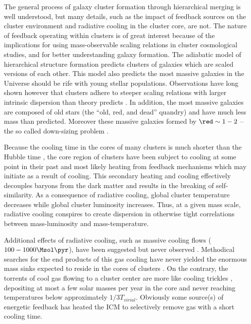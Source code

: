 \documentclass[12pt, preprint]{aastex}
\begin{document}
The general process of galaxy cluster formation through hierarchical
merging is well understood, but many details, such as the impact of
feedback sources on the cluster environment and radiative cooling in
the cluster core, are not. The nature of feedback operating within
clusters is of great interest because of the implications for using
mass-observable scaling relations in cluster cosmological studies, and
for better understanding galaxy formation. The adiabatic model of
hierarchical structure formation predicts clusters of galaxies which
are scaled versions of each other. This model also predicts the most
massive galaxies in the Universe should be rife with young stellar
populations. Observations have long shown \citep{1999ApJ...520...78H,
2000ApJ...536...73N, 2001A&A...368..749F} however that clusters adhere
to steeper scaling relations with larger intrinsic dispersion than
theory predicts \citep{1996ApJ...469..494E, 1997MNRAS.292..289E}. In
addition, the most massive galaxies are composed of old stars (the
``old, red, and dead'' quandry) and have much less mass than predicted.
Moreover these massive galaxies formed by $\red \sim 1-2$
\citep{1996MNRAS.283.1388M, 1996Natur.384..439S} -- the so called
down-sizing problem \citep{1996AJ....112..839C}.

Because the cooling time in the cores of many clusters is much shorter
than the Hubble time \citep{1994ARA&A..32..277F, 1998MNRAS.298..416P},
the core region of clusters have been subject to cooling at some point
in their past and most likely heating from feedback mechanisms which
may initiate as a result of cooling. This secondary heating and
cooling effectively decouples baryons from the dark matter and results
in the breaking of self-similarity. As a consequence of radiative
cooling, global cluster temperature decreases while global cluster
luminosity increases. Thus, at a given mass scale, radiative cooling
conspires to create dispersion in otherwise tight correlations between
mass-luminosity and mass-temperature.

Additional effects of radiative cooling, such as massive cooling
flows ($100-1000 \Msol \pyr$), have been suggested but never
observed \citep{tamura2001, peterson2001}. Methodical searches for the
end products of this gas cooling have never yielded the enormous mass
sinks expected to reside in the cores of clusters \citep{heckman89,
mcnamara90, odea94, voit95} . On the contrary, the torrents of cool
gas flowing to a cluster center are more like cooling trickles
\citep{peterson2003}, depositing at most a few solar masses per year
in the core and never reaching temperatures below approximately $1/3
T_{virial}$. Obviously some source(s) of energetic feedback has heated
the ICM to selectively remove gas with a short cooling time.
\end{document}

